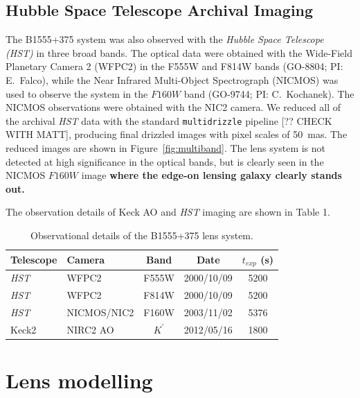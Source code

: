 \documentclass[useAMS,usenatbib]{mn2e}
\begin{document}
\subsection{Hubble Space Telescope Archival Imaging}

The B1555+375 system was also observed with the \textit{Hubble Space Telescope
(\textit{HST})} in three broad bands.  The optical data were obtained with the
Wide-Field Planetary Camera 2 (WFPC2) in the F555W and F814W bands
(GO-8804; PI: E.\ Falco), while the Near Infrared Multi-Object
Spectrograph (NICMOS) was used to observe the system in the $F160W$
band (GO-9744; PI: C.\ Kochanek).  The NICMOS observations were
obtained with the NIC2 camera.  We reduced all of the archival \textit{HST}
data with the standard {\tt multidrizzle} pipeline [?? CHECK WITH
  MATT], producing final drizzled images with pixel scales of 50~mas.
The reduced images are shown in Figure~\ref{fig:multiband}.  The lens
system is not detected at high significance in the optical bands, but
is clearly seen in the NICMOS $F160W$ image \textbf{where the edge-on lensing
galaxy clearly stands out.}

The observation details of Keck AO and \textit{HST} imaging are shown in Table 1.

\begin{table}
 \centering
  \caption{Observational details of the B1555+375 lens system.}
  \begin{tabular}{@{}llccc}
  
\hline
  Telescope     &      Camera     &  Band & Date &$t_{exp}$ (s) \\

 \hline
   \textit{HST}				&		WFPC2    &  F555W		&	2000/10/09 	&	5200\\
   \textit{HST}				&		WFPC2    &  F814W		&	2000/10/09 &	5200\\
   \textit{HST}				&		NICMOS/NIC2	&	F160W	&	2003/11/02 & 5376\\
   Keck2			&		NIRC2 AO	&   $K^\prime$	& 2012/05/16	&  1800\\
   \hline
\end{tabular}
\end{table}


\section{Lens modelling}
\end{document}
